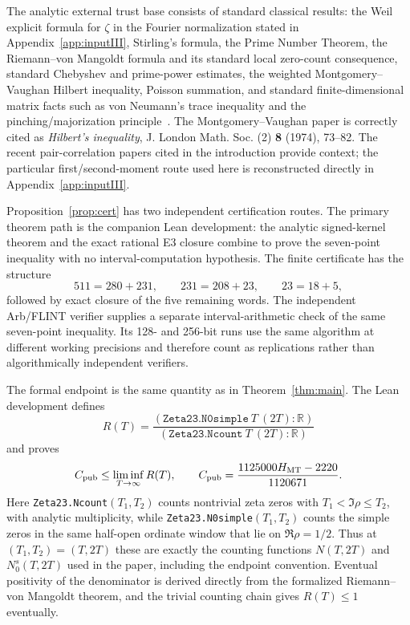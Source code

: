 \documentclass[11pt]{article}
\begin{document}
The analytic external trust base consists of standard classical results: the
Weil explicit formula for $\zeta$ in the Fourier normalization stated in
Appendix~\ref{app:inputIII}, Stirling's formula, the Prime Number Theorem, the
Riemann--von Mangoldt formula and its standard local zero-count consequence,
standard Chebyshev and prime-power estimates, the weighted
Montgomery--Vaughan Hilbert inequality, Poisson summation, and standard
finite-dimensional matrix facts such as von Neumann's trace inequality and the
pinching/majorization principle~\cite{Bhatia97}.  The Montgomery--Vaughan paper
is correctly cited as \emph{Hilbert's inequality}, J. London Math. Soc. (2)
\textbf{8} (1974), 73--82.  The recent pair-correlation papers cited in the
introduction provide context; the particular first/second-moment route used
here is reconstructed directly in Appendix~\ref{app:inputIII}.

Proposition~\ref{prop:cert} has two independent certification routes.  The
primary theorem path is the companion Lean development: the analytic
signed-kernel theorem and the exact rational E3 closure combine to prove the
seven-point inequality with no interval-computation hypothesis.  The finite
certificate has the structure
\[
 511=280+231,\qquad
 231=208+23,\qquad
 23=18+5,
\]
followed by exact closure of the five remaining words.  The independent
Arb/FLINT verifier supplies a separate interval-arithmetic check of the same
seven-point inequality.  Its 128- and 256-bit runs use the same algorithm at
different working precisions and therefore count as replications rather than
algorithmically independent verifiers.

The formal endpoint is the same quantity as in Theorem~\ref{thm:main}.  The
Lean development defines
\[
 R(T)=
 \frac{(\texttt{Zeta23.N0simple}\ T\ (2T):\mathbb R)}
      {(\texttt{Zeta23.Ncount}\ T\ (2T):\mathbb R)}
\]
and proves
\[
 C_{\rm pub}\le \liminf_{T\to\infty}R(T),
\qquad
 C_{\rm pub}
 =\frac{1125000H_{\rm MT}-2220}{1120671}.
\]
Here \texttt{Zeta23.Ncount}\((T_1,T_2)\) counts nontrivial zeta zeros with
\(T_1<\Im\rho\le T_2\), with analytic multiplicity, while
\texttt{Zeta23.N0simple}\((T_1,T_2)\) counts the simple zeros in the same
half-open ordinate window that lie on \(\Re\rho=1/2\).  Thus at
\((T_1,T_2)=(T,2T)\) these are exactly the counting functions \(N(T,2T)\)
and \(N_0^s(T,2T)\) used in the paper, including the endpoint convention.
Eventual positivity of the denominator is derived directly from the formalized
Riemann--von Mangoldt theorem, and the trivial counting chain gives
\(R(T)\le1\) eventually.
\end{document}

